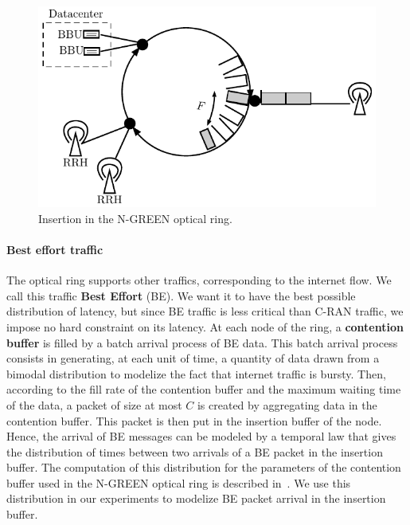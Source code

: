 \documentclass[10pt, conference, letterpaper]{IEEEtran}
\begin{document}
    
\begin{figure}[h!]
\begin{center}   

      \includegraphics[scale=0.7]{interface.pdf}
     \caption{Insertion in the N-GREEN optical ring.}\label{fig:interface}
     
\end{center}
  \end{figure}


\paragraph{Best effort traffic}

The optical ring supports other traffics, corresponding to the internet flow. We call this traffic \textbf{Best Effort} (BE). We want it to have the best possible distribution of latency, but since BE traffic is less critical than C-RAN traffic, we impose no hard constraint on its latency. At each node of the ring, a {\bf contention buffer} is filled by a batch arrival process of BE data. 
This batch arrival process consists in generating, at each unit of time, a quantity of data drawn from a bimodal distribution to modelize the fact that internet traffic is bursty. Then, according to the fill rate of the contention buffer and the maximum waiting time of the data, a packet of size at most $C$ is created by aggregating data in the contention buffer. This packet is then put in the insertion buffer of the node. Hence, the arrival of BE messages can be modeled by a temporal law that gives the distribution of times between two arrivals of a BE packet in the insertion buffer. The computation of this distribution for the parameters of the contention buffer used in the N-GREEN optical ring is described in~\cite{Cast1810:Performance}. We use this distribution in our experiments to modelize BE packet arrival in the insertion buffer.
\end{document}
